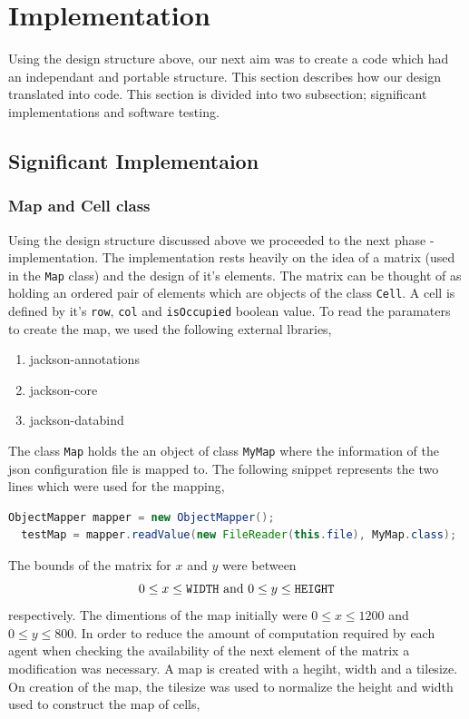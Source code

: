 \section{Implementation}
\indent Using the design structure above, our next aim was to create a code which had an independant and portable structure. This section describes how our design translated into code. This section is divided into two subsection; significant implementations and software testing.

\subsection{Significant Implementaion}

\subsubsection{Map and Cell class}
\indent Using the design structure discussed above we proceeded to the next phase - implementation. The implementation rests heavily on the idea of a matrix (used in the \texttt{Map} class) and the design of it's elements. The matrix can be thought of as holding an ordered pair of elements which are objects of the class \texttt{Cell}. A cell is defined by it's \texttt{row}, \texttt{col} and \texttt{isOccupied} boolean value. To read the paramaters to create the map, we used the following external lbraries, 

\begin{enumerate}[itemsep=1pt]
\item jackson-annotations
\item jackson-core
\item jackson-databind 
\end{enumerate}

The class \texttt{Map} holds the an object of class \texttt{MyMap} where the information of the json configuration file is mapped to. The following snippet represents the two lines which were used for the mapping, 

\begin{lstlisting}[language=java]
  ObjectMapper mapper = new ObjectMapper();
  testMap = mapper.readValue(new FileReader(this.file), MyMap.class);
\end{lstlisting}

The bounds of the matrix for $x$ and $y$ were between
\begin{equation*}
 0 \le x \le \texttt{WIDTH} \textnormal{  and  }  0 \le y \le \texttt{HEIGHT}
\end{equation*}
 respectively. The dimentions of the map initially were $0 \leq x \leq 1200$ and $0 \leq y \leq 800$. In order to reduce the amount of computation required by each agent when checking the availability of the next element of the matrix a modification was necessary. A map is created with a hegiht, width and a tilesize. On creation of the map, the tilesize was used to normalize the height and width used to construct the map of cells, 

